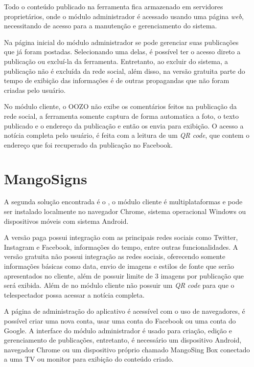 Todo o conteúdo publicado na ferramenta fica armazenado em servidores proprietários, onde o módulo administrador é acessado usando uma página \textit{web}, necessitando de acesso para a manutenção e gerenciamento do sistema. 

Na página inicial do módulo administrador se pode gerenciar suas publicações que já foram postadas. Selecionando uma delas, é possível ter o acesso direto a publicação ou excluí-la da ferramenta. Entretanto, ao excluir do sistema, a publicação não é excluída da rede social, além disso, na versão gratuita parte do tempo de exibição das informações é de outras propagandas que não foram criadas pelo usuário. 

No módulo cliente, o OOZO não exibe os comentários feitos na publicação da rede social, a ferramenta somente captura de forma automatica a foto, o texto publicado e o endereço da publicação e então os envia para exibição. O acesso a notícia completa pelo usuário, é feita com a leitura de um \textit{QR code}, que contem o endereço que foi recuperado da publicação no Facebook.

\section{MangoSigns}
\label{sec:mango}
A segunda solução encontrada é o \citet{mango2017}, o módulo cliente é multiplataformas e pode ser instalado localmente no navegador Chrome, sistema operacional Windows ou dispositivos móveis com sistema Android.

A versão paga possui integração com as principais redes sociais como Twitter, Instagram e Facebook, informações do tempo, entre outras funcionalidades. A versão gratuita não possui integração as redes sociais, oferecendo somente informações básicas como data, envio de imagens e estilos de fonte que serão apresentados no cliente, além de possuir limite de 3 imagens por publicação que será exibida. Além de no módulo cliente não possuir um \textit{QR code} para que o telespectador possa acessar a notícia completa.

A página de administração do aplicativo é acessível com o uso de navegadores, é possível criar uma nova conta, usar uma conta do Facebook ou uma conta do Google. A interface do módulo administrador é usado para criação, edição e gerenciamento de publicações, entretanto, é necessário um dispositivo Android, navegador Chrome ou um dispositivo próprio chamado MangoSing Box conectado a uma TV ou monitor para exibição do conteúdo criado.

